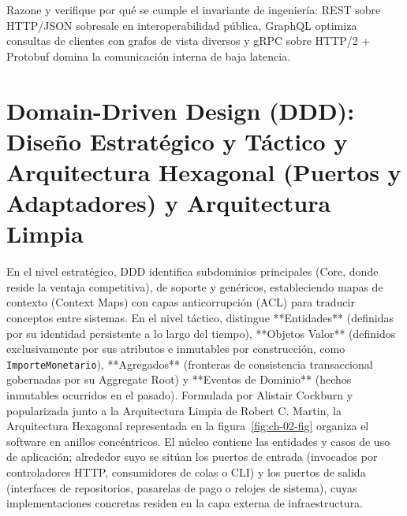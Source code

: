 \documentclass{book}
\begin{document}
\begin{tcolorbox}[title={Autoficha}, studiumcheck, breakable]

Razone y verifique por qué se cumple el invariante de ingeniería: REST sobre HTTP/JSON sobresale en interoperabilidad pública, GraphQL optimiza consultas de clientes con grafos de vista diversos y gRPC sobre HTTP/2 + Protobuf domina la comunicación interna de baja latencia.
\end{tcolorbox}

\section{Domain-Driven Design (DDD): Diseño Estratégico y Táctico y Arquitectura Hexagonal (Puertos y Adaptadores) y Arquitectura Limpia}

En el nivel estratégico, DDD identifica subdominios principales (Core, donde reside la ventaja competitiva), de soporte y genéricos, estableciendo mapas de contexto (Context Maps) con capas anticorrupción (ACL) para traducir conceptos entre sistemas. En el nivel táctico, distingue **Entidades** (definidas por su identidad persistente a lo largo del tiempo), **Objetos Valor** (definidos exclusivamente por sus atributos e inmutables por construcción, como \texttt{ImporteMonetario}), **Agregados** (fronteras de consistencia transaccional gobernadas por su Aggregate Root) y **Eventos de Dominio** (hechos inmutables ocurridos en el pasado).
Formulada por Alistair Cockburn y popularizada junto a la Arquitectura Limpia de Robert C. Martin, la Arquitectura Hexagonal representada en la figura~\ref{fig:ch-02-fig} organiza el software en anillos concéntricos. El núcleo contiene las entidades y casos de uso de aplicación; alrededor suyo se sitúan los puertos de entrada (invocados por controladores HTTP, consumidores de colas o CLI) y los puertos de salida (interfaces de repositorios, pasarelas de pago o relojes de sistema), cuyas implementaciones concretas residen en la capa externa de infraestructura.
\end{document}
